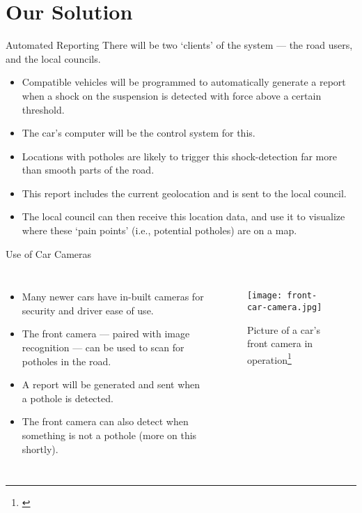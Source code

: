 \documentclass{beamer}
\begin{document}
\section{Our Solution}

\begin{frame}{Automated Reporting}
    There will be two `clients' of the system --- the road users, and the local councils.

    \begin{itemize}
        \item Compatible vehicles will be programmed to automatically generate a report when a shock on the suspension is detected with force above a certain threshold.
        \item The car's computer will be the control system for this.
        \item Locations with potholes are likely to trigger this shock-detection far more than smooth parts of the road.
        \item This report includes the current geolocation and is sent to the local council.
        \item The local council can then receive this location data, and use it to visualize where these `pain points' (i.e., potential potholes) are on a map.
    \end{itemize}
\end{frame}

\begin{frame}{Use of Car Cameras}
    \begin{columns}

        \begin{itemize}
            \item Many newer cars have in-built cameras for security and driver ease of use.
            \item The front camera --- paired with image recognition --- can be used to scan for potholes in the road.
            \item A report will be generated and sent when a pothole is detected.
            \item The front camera can also detect when something is \alert{not} a pothole (more on this shortly).
        \end{itemize}


        \begin{figure}
            \texttt{[image: front-car-camera.jpg]}
            \caption{Picture of a car's front camera in operation\footnote[frame]{\cite{front-camera-picture}}}
        \end{figure}
    \end{columns}
\end{frame}
\end{document}

